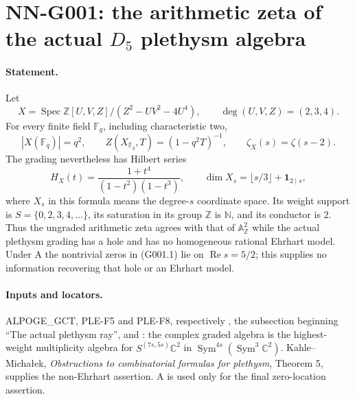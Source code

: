 \section{NN-G001: the arithmetic zeta of the actual $D_5$ plethysm algebra}
\paragraph{Statement.}
Let
\[
 X=\operatorname{Spec}\mathbb Z[U,V,Z]/(Z^2-UV^2-4U^4),
 \qquad \deg(U,V,Z)=(2,3,4).
\]
For every finite field $\mathbb F_q$, including characteristic two,
\[
 |X(\mathbb F_q)|=q^2,\qquad
 Z(X_{\mathbb F_q},T)=(1-q^2T)^{-1},\qquad
 \zeta_X(s)=\zeta(s-2).
 \tag{G001.1}
\]
The grading nevertheless has Hilbert series
\[
 H_X(t)=\frac{1+t^4}{(1-t^2)(1-t^3)},\qquad
 \dim X_s=\lfloor s/3\rfloor+\mathbf1_{2\mid s},
 \tag{G001.2}
\]
where $X_s$ in this formula means the degree-$s$ coordinate space. Its
weight support is $S=\{0,2,3,4,\ldots\}$, its saturation in its group
$\mathbb Z$ is $\mathbb N$, and its conductor is $2$. Thus the ungraded
arithmetic zeta agrees with that of $\mathbb A^2_{\mathbb Z}$ while the
actual plethysm grading has a hole and has no homogeneous rational
Ehrhart model. Under A the nontrivial zeros in (G001.1) lie on
$\operatorname{Re}s=5/2$; this supplies no information recovering that
hole or an Ehrhart model.

\paragraph{Inputs and locators.}
ALPOGE\_GCT, PLE-F5 and PLE-F8, respectively
, the subsection beginning ``The actual
plethysm ray'', and :
the complex graded algebra is the highest-weight multiplicity algebra
for $S^{(7s,5s)}\mathbb C^2$ in
$\operatorname{Sym}^{4s}(\operatorname{Sym}^3\mathbb C^2)$.
Kahle--Micha\l{}ek, \emph{Obstructions to combinatorial formulas for
plethysm}, Theorem 5, supplies the non-Ehrhart assertion. A is used
only for the final zero-location assertion.

